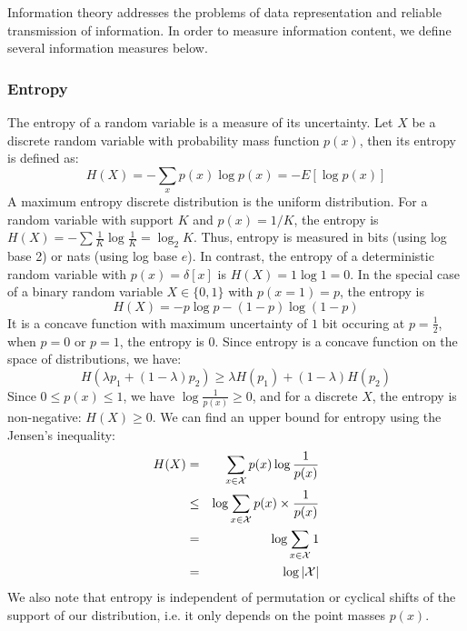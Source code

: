 Information theory addresses the problems of data representation and reliable transmission of information. In order to measure information content, we define several information measures below.

\subsubsection{Entropy}

The entropy of a random variable is a measure of its uncertainty. Let $X$ be a discrete random variable with probability mass function $p(x)$, then its entropy is defined as:
\begin{equation}
    H(X) = -\sum_{x} p(x) \log p(x) = -E[\log p(x)]
\end{equation}
A maximum entropy discrete distribution is the uniform distribution. For a random variable with support $K$ and $p(x)=1/K$, the entropy is $H(X)= -\sum \frac{1}{K} \log \frac{1}{K} = \log_2 K$. Thus, entropy is measured in bits (using log base 2) or nats (using log base $e$). In contrast, the entropy of a deterministic random variable with $p(x) = \delta[x]$ is $H(X) = 1\log 1 = 0$. In the special case of a binary random variable $X \in \{0,1\}$ with $p(x=1)=p$, the entropy is
\begin{equation}
    H(X) = -p \log p - (1-p)\log (1-p)
\end{equation}
It is a concave function with maximum uncertainty of $1$ bit occuring at $p=\frac{1}{2}$, when $p=0$ or $p=1$, the entropy is $0$. Since entropy is a concave function on the space of distributions, we have:
\begin{equation}
    H(\lambda p_1 + (1-\lambda) p_2) \geq \lambda H(p_1) + (1-\lambda) H(p_2)
\end{equation}
Since $0\leq p(x) \leq 1$, we have $\log \frac{1}{p(x)} \geq 0$, and for a discrete $X$, the entropy is non-negative: $H(X)\geq 0$. We can find an upper bound for entropy using the Jensen's inequality:
\begin{eqnarray}
    H(X) &=& \sum_{x \in \cal X} p(x)\log \frac{1}{p(x)} \\
         &\leq& \log \sum_{x \in \cal X} p(x)\times \frac{1}{p(x)} \\
         &=& \log \sum_{x \in \cal X} 1 \\
         &=& \log |\cal X|
\end{eqnarray}
We also note that entropy is independent of permutation or cyclical shifts of the support of our distribution, i.e. it only depends on the point masses $p(x)$.\\


